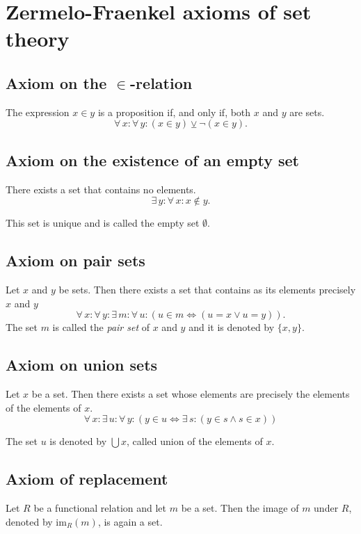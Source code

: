 \documentclass[root.tex]{subfiles}
\begin{document}
\section{Zermelo-Fraenkel axioms of set theory}

\subsection{Axiom on the $\in$-relation} 
The expression $x\in y$ is a proposition if, and only if, both $x$ and $y$ are sets.
$$
\forall \, x : \forall \, y : (x\in y) \veebar \neg (x\in y).
$$

\subsection{Axiom on the existence of an empty set}
There exists a set that contains no elements. $$
\exists \, y : \forall \, x : x \notin y .
$$

\begin{theorem}
This set is unique and is called the empty set $\emptyset$.
\end{theorem}

\subsection{Axiom on pair sets}
Let $x$ and $y$ be sets. Then there exists a set that contains as its elements precisely $x$ and $y$
$$
\forall \, x : \forall \, y : \exists \, m : \forall \, u : (u\in m \Leftrightarrow (u = x \lor u = y)).
$$
The set $m$ is called the \emph{pair set} of $x$ and $y$ and it is denoted by $\{x,y\}$.

\subsection{Axiom on union sets}
Let $x$ be a set. Then there exists a set whose elements are precisely the elements of the elements of $x$. 
$$
\forall \, x : \exists \, u : \forall \, y : (y \in u \Leftrightarrow \exists \, s :(y \in s\land s \in x))
$$

The set $u$ is denoted by $\bigcup x$, called union of the elements of $x$.

\subsection{Axiom of replacement}
Let $R$ be a functional relation and let $m$ be a set. Then the image of $m$ under $R$, denoted by $\text{im}_R(m)$, is again a set.
\end{document}
